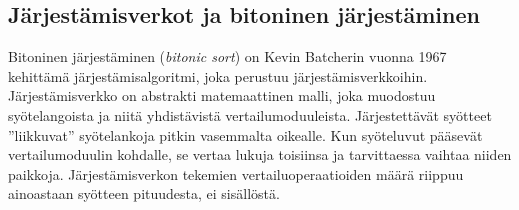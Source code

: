 \documentclass[a4paper,11pt]{article}
\newcommand{\engl}[1]{\foreignlanguage{english}{\em #1}}
\begin{document}
%
%
%
%

\subsection{Järjestämisverkot ja bitoninen järjestäminen}

Bitoninen järjestäminen (\engl{bitonic sort}) on Kevin Batcherin vuonna 1967 kehittämä järjestämisalgoritmi, joka perustuu järjestämisverkkoihin. Järjestämisverkko on abstrakti matemaattinen malli, joka muodostuu syötelangoista ja niitä yhdistävistä vertailumoduuleista. Järjestettävät syötteet ''liikkuvat'' syötelankoja pitkin vasemmalta oikealle. Kun syöteluvut pääsevät vertailumoduulin kohdalle, se vertaa lukuja toisiinsa ja tarvittaessa vaihtaa niiden paikkoja. Järjestämisverkon tekemien vertailuoperaatioiden määrä riippuu ainoastaan syötteen pituudesta, ei sisällöstä.

\end{document}
